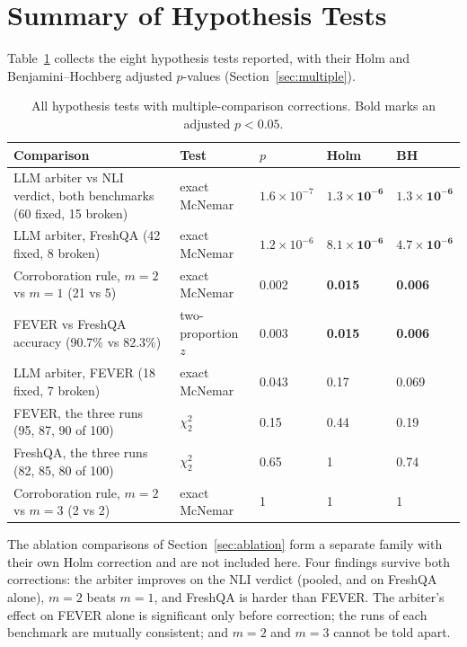 \section{Summary of Hypothesis Tests}
\label{sec:test-summary}

Table~\ref{tab:tests} collects the eight hypothesis tests reported, with their Holm and Benjamini--Hochberg adjusted $p$-values (Section~\ref{sec:multiple}).

\begin{table}[htbp]
\centering
\caption{All hypothesis tests with multiple-comparison corrections. Bold marks an adjusted $p < 0.05$.}
\label{tab:tests}
\small
\begin{tabularx}{\textwidth}{@{}Xllll@{}}
\toprule
Comparison & Test & $p$ & Holm & BH \\
\midrule
LLM arbiter vs NLI verdict, both benchmarks (60 fixed, 15 broken) & exact McNemar & $1.6 \times 10^{-7}$ & $\mathbf{1.3 \times 10^{-6}}$ & $\mathbf{1.3 \times 10^{-6}}$ \\
LLM arbiter, FreshQA (42 fixed, 8 broken) & exact McNemar & $1.2 \times 10^{-6}$ & $\mathbf{8.1 \times 10^{-6}}$ & $\mathbf{4.7 \times 10^{-6}}$ \\
Corroboration rule, $m = 2$ vs $m = 1$ (21 vs 5) & exact McNemar & 0.002 & \textbf{0.015} & \textbf{0.006} \\
FEVER vs FreshQA accuracy (90.7\% vs 82.3\%) & two-proportion $z$ & 0.003 & \textbf{0.015} & \textbf{0.006} \\
LLM arbiter, FEVER (18 fixed, 7 broken) & exact McNemar & 0.043 & 0.17 & 0.069 \\
FEVER, the three runs (95, 87, 90 of 100) & $\chi^2_2$ & 0.15 & 0.44 & 0.19 \\
FreshQA, the three runs (82, 85, 80 of 100) & $\chi^2_2$ & 0.65 & 1 & 0.74 \\
Corroboration rule, $m = 2$ vs $m = 3$ (2 vs 2) & exact McNemar & 1 & 1 & 1 \\
\bottomrule
\end{tabularx}
\end{table}

The ablation comparisons of Section~\ref{sec:ablation} form a separate family with their own Holm correction and are not included here. Four findings survive both corrections: the arbiter improves on the NLI verdict (pooled, and on FreshQA alone), $m = 2$ beats $m = 1$, and FreshQA is harder than FEVER. The arbiter's effect on FEVER alone is significant only before correction; the runs of each benchmark are mutually consistent; and $m = 2$ and $m = 3$ cannot be told apart.

